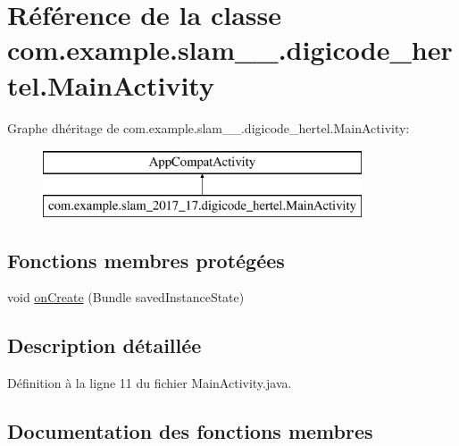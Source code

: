 \hypertarget{classcom_1_1example_1_1slam__2017__17_1_1digicode__hertel_1_1_main_activity}{}\section{Référence de la classe com.\+example.\+slam\+\_\+\_.\+digicode\+\_\+hertel.\+Main\+Activity}
\label{classcom_1_1example_1_1slam__2017__17_1_1digicode__hertel_1_1_main_activity}
Graphe d\textquotesingle{}héritage de com.\+example.\+slam\+\_\+\_.\+digicode\+\_\+hertel.\+Main\+Activity\+:\begin{figure}[H]
\begin{center}
\leavevmode
\includegraphics[height=2.000000cm]{classcom_1_1example_1_1slam__2017__17_1_1digicode__hertel_1_1_main_activity}
\end{center}
\end{figure}
\subsection*{Fonctions membres protégées}
\begin{DoxyCompactItemize}
\item 
void \hyperlink{classcom_1_1example_1_1slam__2017__17_1_1digicode__hertel_1_1_main_activity_ac28f62bda94de44539157879a4a422e8}{on\+Create} (Bundle saved\+Instance\+State)
\end{DoxyCompactItemize}


\subsection{Description détaillée}


Définition à la ligne 11 du fichier Main\+Activity.\+java.



\subsection{Documentation des fonctions membres}
\hypertarget{classcom_1_1example_1_1slam__2017__17_1_1digicode__hertel_1_1_main_activity_ac28f62bda94de44539157879a4a422e8}{}
